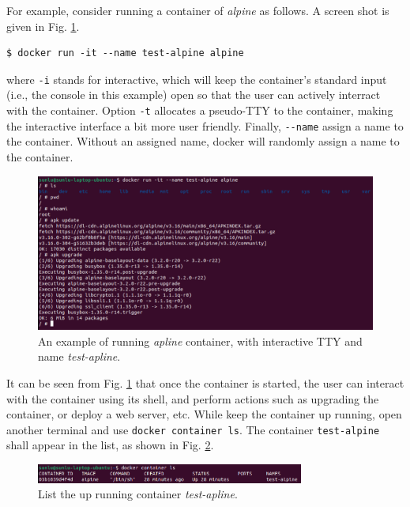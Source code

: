 For example, consider running a container of \textit{alpine} as follows. A screen shot is given in Fig. \ref{chvirtualizationandcontainerization:fig:dockerrunexp}.
\begin{lstlisting}
$ docker run -it --name test-alpine alpine
\end{lstlisting}
where \verb|-i| stands for interactive, which will keep the container's standard input (i.e., the console in this example) open so that the user can actively interract with the container. Option \verb|-t| allocates a pseudo-TTY to the container, making the interactive interface a bit more user friendly. Finally, \verb|--name| assign a name to the container. Without an assigned name, docker will randomly assign a name to the container.
\begin{figure}
	\centering
	\includegraphics[width=350pt]{chapters/ch_virtualization_and_containerization/figures/dockerrunexp.png}
	\caption{An example of running \textit{apline} container, with interactive TTY and name \textit{test-apline}.} \label{chvirtualizationandcontainerization:fig:dockerrunexp}
\end{figure}

It can be seen from Fig. \ref{chvirtualizationandcontainerization:fig:dockerrunexp} that once the container is started, the user can interact with the container using its shell, and perform actions such as upgrading the container, or deploy a web server, etc. While keep the container up running, open another terminal and use \verb|docker container ls|. The container \verb|test-alpine| shall appear in the list, as shown in Fig. \ref{chvirtualizationandcontainerization:fig:dockerrunexppart2}.
\begin{figure}
	\centering
	\includegraphics[width=250pt]{chapters/ch_virtualization_and_containerization/figures/dockerrunexppart2.png}
	\caption{List the up running container \textit{test-apline}.} \label{chvirtualizationandcontainerization:fig:dockerrunexppart2}
\end{figure}

